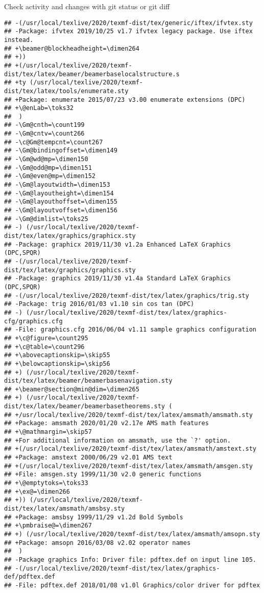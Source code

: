 \documentclass[ignorenonframetext,]{beamer}
\begin{document}
\begin{frame}[fragile]{Check activity and changes with git status or git
diff}
\begin{verbatim}
## -(/usr/local/texlive/2020/texmf-dist/tex/generic/iftex/ifvtex.sty
## -Package: ifvtex 2019/10/25 v1.7 ifvtex legacy package. Use iftex instead.
## +\beamer@blockheadheight=\dimen264
## +))
## +(/usr/local/texlive/2020/texmf-dist/tex/latex/beamer/beamerbaselocalstructure.s
## +ty (/usr/local/texlive/2020/texmf-dist/tex/latex/tools/enumerate.sty
## +Package: enumerate 2015/07/23 v3.00 enumerate extensions (DPC)
## +\@enLab=\toks32
##  )
## -\Gm@cnth=\count199
## -\Gm@cntv=\count266
## -\c@Gm@tempcnt=\count267
## -\Gm@bindingoffset=\dimen149
## -\Gm@wd@mp=\dimen150
## -\Gm@odd@mp=\dimen151
## -\Gm@even@mp=\dimen152
## -\Gm@layoutwidth=\dimen153
## -\Gm@layoutheight=\dimen154
## -\Gm@layouthoffset=\dimen155
## -\Gm@layoutvoffset=\dimen156
## -\Gm@dimlist=\toks25
## -) (/usr/local/texlive/2020/texmf-dist/tex/latex/graphics/graphicx.sty
## -Package: graphicx 2019/11/30 v1.2a Enhanced LaTeX Graphics (DPC,SPQR)
## -(/usr/local/texlive/2020/texmf-dist/tex/latex/graphics/graphics.sty
## -Package: graphics 2019/11/30 v1.4a Standard LaTeX Graphics (DPC,SPQR)
## -(/usr/local/texlive/2020/texmf-dist/tex/latex/graphics/trig.sty
## -Package: trig 2016/01/03 v1.10 sin cos tan (DPC)
## -) (/usr/local/texlive/2020/texmf-dist/tex/latex/graphics-cfg/graphics.cfg
## -File: graphics.cfg 2016/06/04 v1.11 sample graphics configuration
## +\c@figure=\count295
## +\c@table=\count296
## +\abovecaptionskip=\skip55
## +\belowcaptionskip=\skip56
## +) (/usr/local/texlive/2020/texmf-dist/tex/latex/beamer/beamerbasenavigation.sty
## +\beamer@section@min@dim=\dimen265
## +) (/usr/local/texlive/2020/texmf-dist/tex/latex/beamer/beamerbasetheorems.sty (
## +/usr/local/texlive/2020/texmf-dist/tex/latex/amsmath/amsmath.sty
## +Package: amsmath 2020/01/20 v2.17e AMS math features
## +\@mathmargin=\skip57
## +For additional information on amsmath, use the `?' option.
## +(/usr/local/texlive/2020/texmf-dist/tex/latex/amsmath/amstext.sty
## +Package: amstext 2000/06/29 v2.01 AMS text
## +(/usr/local/texlive/2020/texmf-dist/tex/latex/amsmath/amsgen.sty
## +File: amsgen.sty 1999/11/30 v2.0 generic functions
## +\@emptytoks=\toks33
## +\ex@=\dimen266
## +)) (/usr/local/texlive/2020/texmf-dist/tex/latex/amsmath/amsbsy.sty
## +Package: amsbsy 1999/11/29 v1.2d Bold Symbols
## +\pmbraise@=\dimen267
## +) (/usr/local/texlive/2020/texmf-dist/tex/latex/amsmath/amsopn.sty
## +Package: amsopn 2016/03/08 v2.02 operator names
##  )
## -Package graphics Info: Driver file: pdftex.def on input line 105.
## -(/usr/local/texlive/2020/texmf-dist/tex/latex/graphics-def/pdftex.def
## -File: pdftex.def 2018/01/08 v1.0l Graphics/color driver for pdftex

\end{verbatim}
\end{frame}
\end{document}
